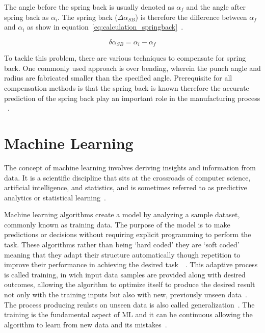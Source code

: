 The angle before the spring back is usually denoted as $\alpha_f$ and the angle after spring back as $\alpha_i$.
The spring back ($\Delta \alpha_{SB}$) is therefore the difference between $\alpha_f$ and
$\alpha_i$ as show in equation~\ref*{eq:calculation_springback}~\cite[p. 6]{cruz_applicationmachinelearning_2021}.

\begin{equation}
    \delta \alpha_{SB} = \alpha_i - \alpha_f
    \label{eq:calculation_springback}
\end{equation}

To tackle this problem, there are various techniques to compensate for spring back.
One commonly used approach is over bending, wherein the punch angle and radius are fabricated smaller than the
specified angle.
Prerequisite for all compensation methods is that the spring back is known therefore
the accurate prediction of the spring back play an important role in the manufacturing
process ~\cite[p. 114]{groover_fundamentalsmodernmanufacturing_2020}.


\section{Machine Learning}\label{sec:machine-learning}
The concept of machine learning involves deriving insights and information from data.
It is a scientific discipline that sits at the crossroads of computer science, artificial intelligence, and statistics,
and is sometimes referred to as predictive analytics or statistical
learning~\cite[p. 1]{muller_introductionmachinelearning_2016}.

Machine learning algorithms create a model by analyzing a sample dataset, commonly known as training data. The
purpose of the model is to make predictions or decisions without requiring explicit programming to perform the task.
These algorithms rather than being `hard coded' they are `soft coded' meaning that they adapt their structure
automatically though repetition to improve their performance in achieving the desired task~\cite[pp. 4]{el2015machine
}~\cite[pp. 151--170]{koza1996automated}.
This adaptive process is called training, in wich input data samples are provided along with desired outcomes,
allowing the algorithm to optimize itself to produce the desired result not only with the training inputs but also with
new, previously unseen data~\cite[pp. 4]{el2015machine}.
The process producing reulsts on unseen data is also called generalization~\cite[p. 4]{zhou_machinelearning_2021}.
The training is the fundamental aspect of \ac{ML} and it can be continuous allowing the algorithm to
learn from new data and its mistakes~\cite[pp. 4]{el2015machine}.

